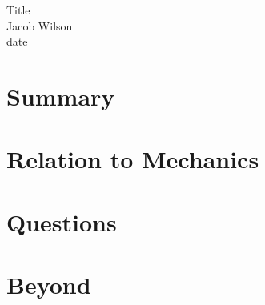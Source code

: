 \documentclass[a4paper]{article}
\begin{document}
\begin{center}
\large{Title}\\
\small{Jacob Wilson}\\
\small{date}
\end{center}

\section{Summary}

\section{Relation to Mechanics}

\section{Questions}

\section{Beyond}
\end{document}
